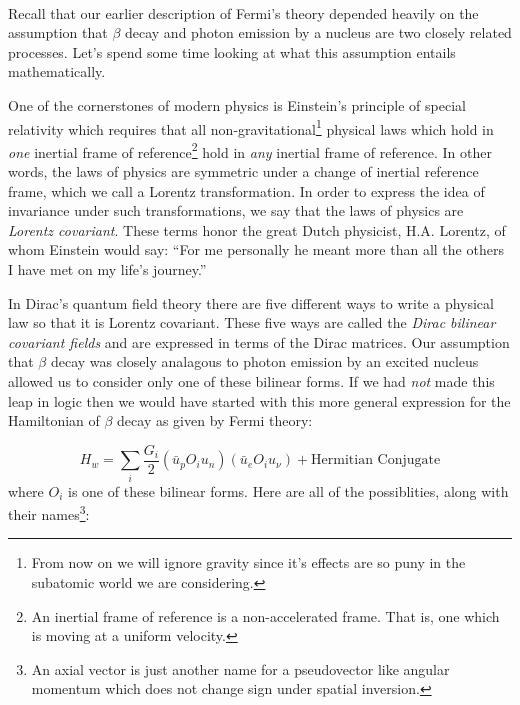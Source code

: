 \documentclass[12pt]{book}
\begin{document}
\paragraph{}Recall that our earlier description of Fermi's theory depended heavily on the assumption that $\beta$ decay and photon emission by a nucleus are two closely related processes. Let's spend some time looking at what this assumption entails mathematically.

One of the cornerstones of modern physics is Einstein's principle of special relativity which requires that all non-gravitational\footnote{From now on we will ignore gravity since it's effects are so puny in the subatomic world we are considering.} physical laws which hold in \emph{one} inertial frame of reference\footnote{An inertial frame of reference is a non-accelerated frame. That is, one which is moving at a uniform velocity.} hold in \emph{any} inertial frame of reference. In other words, the laws of physics are symmetric under a change of inertial reference frame, which we call a Lorentz transformation. In order to express the idea of invariance under such transformations, we say that the laws of physics are \emph{Lorentz covariant}. These terms honor the great Dutch physicist, H.A. Lorentz, of whom Einstein would say: ``For me personally he meant more than all the others I have met on my life's journey.''

In Dirac's quantum field theory there are five different ways to write a physical law so that it is Lorentz covariant. These five ways are called the \emph{Dirac bilinear covariant fields} and are expressed in terms of the Dirac matrices\cite{maggiore}. Our assumption that $\beta$ decay was closely analagous to photon emission by an excited nucleus allowed us to consider only one of these bilinear forms. If we had \emph{not} made this leap in logic then we would have started with this more general expression for the Hamiltonian of $\beta$ decay as given by Fermi theory:

\begin{equation}\label{general:fermi}
 H_{w}=\displaystyle\sum_{i}\frac{G_{i}}{2}\left(\bar{u}_{p}O_{i}u_{n}\right)\left(\bar{u}_{e}O_{i}u_{\nu}\right) + \text{Hermitian Conjugate}
\end{equation}
where $O_{i}$ is one of these bilinear forms. Here are all of the possiblities, along with their names\footnote{An axial vector is just another name for a pseudovector like angular momentum which does not change sign under spatial inversion.}:
\end{document}
